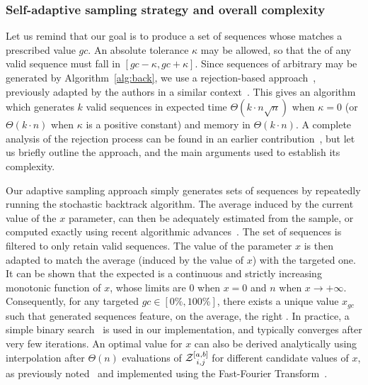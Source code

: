 \subsubsection{Self-adaptive sampling strategy and overall complexity}

Let us remind that our goal is to produce a set of sequences whose \GCContent matches a prescribed value $gc$.
An absolute tolerance $\kappa$ may be allowed, so that the \GCContent of any valid sequence must fall in  
$[gc-\kappa,gc+\kappa]$. Since sequences of arbitrary \GCContent may be generated by Algorithm~\ref{alg:back}, we use a rejection-based approach~\cite{Bodini2010}, previously adapted by the authors in a similar context~\cite{Waldispuhl2011}. This gives an algorithm which generates $k$ valid sequences in expected time $\Theta(k\cdot n\sqrt{n})$ when $\kappa=0$ (or $\Theta(k\cdot n)$ when $\kappa$ is a positive constant) and memory in $\Theta(k\cdot n)$.
A complete analysis of the rejection process can be found in an earlier contribution~\cite{Waldispuhl2011}, but let us briefly outline the approach, and the main arguments used to establish its complexity.

Our adaptive sampling approach simply generates sets of sequences by repeatedly running the stochastic backtrack algorithm. The average \GCContent induced by the current value of the $x$ parameter, can then be adequately estimated from the sample, or computed exactly using recent algorithmic advances~\cite{Ponty2011}. The set of sequences is filtered to only retain valid sequences. The value of the parameter $x$ is then adapted to match the average \GCContent (induced by the value of $x$) with the targeted one.
It can be shown that the expected \GCContent is a continuous and strictly increasing monotonic function of $x$, whose limits are $0$ when $x=0$ and $n$ when $x\to +\infty$. Consequently, for any targeted \GCContent $gc\in[0\%,100\%]$, there exists a unique value $x_{gc}$ such that generated sequences feature, on the average, the right \GCContent.
In practice, a simple binary search~\cite{Waldispuhl2011} is used in our implementation, and typically converges after very few iterations. An optimal value for $x$ can also be derived analytically using interpolation after $\Theta(n)$ evaluations of $\Z{i,j}{a,b}$ for different candidate values of $x$, as previously noted~\cite{Waldispuhl2011} and implemented using the Fast-Fourier Transform~\cite{Senter2012}.


